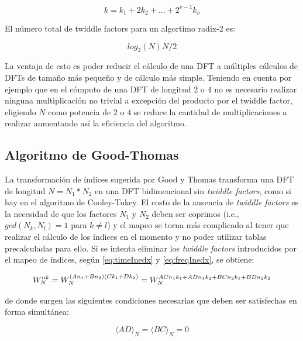 \begin{equation}
k = k_1 + 2k_2+\ldots+2^{\nu-1}k_{\nu}
\label{eq:radix2_k}
\end{equation}

El número total de twiddle factors para un algortimo radix-2 es:

\begin{equation}
log_2(N)N/2
\label{eq:twf_radix2}
\end{equation}

La ventaja de esto es poder reducir el cálculo de  una DFT a múltiples cálculos de DFTs de tamaño
más pequeño y de cálculo más simple. Teniendo en cuenta por ejemplo que en el cómputo de una DFT de
longitud $2$ o $4$ no es necesario realizar ninguna multiplicación no trivial a excepción del
producto por el twiddle factor, eligiendo $N$ como potencia de $2$ o $4$ se reduce la cantidad de
multiplicaciones a realizar aumentando así la eficiencia del algoritmo.
 
\subsection{Algoritmo de Good-Thomas}

La transformación de índices sugerida por Good y Thomas transforma una DFT de longitud $N=N_1*N_2$
en una DFT bidimencional sin \textit{twiddle factors}, como si hay en el algoritmo de Cooley-Tukey.
El costo de la ausencia de \textit{twiddle factors} es la necesidad de que los factores $N_1$ y
$N_2$ deben ser coprimos (i.e., $gcd(N_k,N_l) = 1$ para $k \neq l$) y el mapeo se torna más
complicado al tener que realizar el cálculo de los índices en el momento y no poder utilizar tablas
precalculadas para ello.
Si se intenta eliminar los \textit{twiddle factors} introducidos por el mapeo de índices, según
\ref{eq:timeInedx} y \ref{eq:freqInedx}, se obtiene:

\begin{equation}
	W_N^{nk} = W_N^{(An_1+Bn_2)(Ck_1+Dk_2)} \\
	         = W_N^{ACn_1k_1+ADn_1k_2+BCn_2k_1+BDn_2k_2}
\label{eq:GT_FFT}
\end{equation}

de donde surgen las siguientes condiciones necesarias que deben ser satisfechas en forma simultánea:

\begin{equation}
\langle AD \rangle_N = \langle BC \rangle_N = 0 
\label{eq:GT_cond1}
\end{equation}

